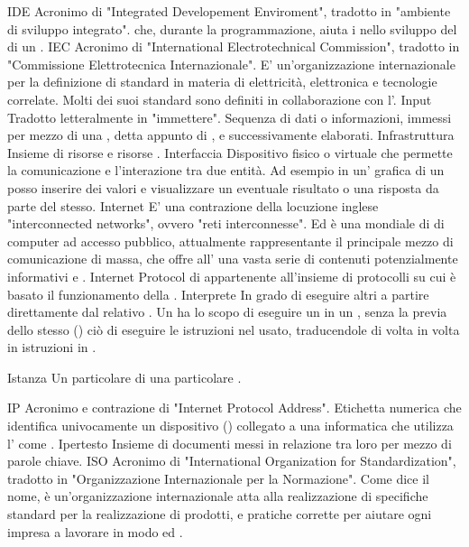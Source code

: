 \elemento
{IDE} 
{Acronimo di "Integrated Developement Enviroment", tradotto in "ambiente di sviluppo integrato".  che, durante la programmazione, aiuta i  nello sviluppo del  di un .}
\elemento
{IEC} 
{Acronimo di "International Electrotechnical Commission", tradotto in "Commissione Elettrotecnica Internazionale". E' un'organizzazione internazionale per la definizione di standard in materia di elettricità, elettronica e tecnologie correlate. Molti dei suoi standard sono definiti in collaborazione con l'.}
\elemento
{Input}
{Tradotto letteralmente in "immettere". Sequenza di dati o informazioni, immessi per mezzo di una , detta appunto di , e successivamente elaborati.}
\elemento
{Infrastruttura} 
{Insieme di risorse  e risorse .}
\elemento
{Interfaccia} 
{Dispositivo fisico o virtuale che permette la comunicazione e l'interazione tra due entità. Ad esempio in un' grafica di un  posso inserire dei valori  e visualizzare un eventuale risultato o una risposta da parte del  stesso.}
\elemento
{Internet} 
{E' una contrazione della locuzione inglese "interconnected networks", ovvero "reti interconnesse".
 Ed è una  mondiale di  di computer ad accesso pubblico, attualmente rappresentante il principale mezzo di comunicazione di massa, che offre all' una vasta serie di contenuti potenzialmente informativi e .}
\elemento
{Internet Protocol}
{ di  appartenente all'insieme di protocolli   su cui è basato il funzionamento della  .}
\elemento
{Interprete} 
{ In grado di eseguire altri  a partire direttamente dal relativo . Un  ha lo scopo di eseguire un  in un , senza la previa  dello stesso () ciò di eseguire le istruzioni nel  usato, traducendole di volta in volta in istruzioni in .}

\elemento
{Istanza}
{Un particolare  di una particolare .}

\elemento
{IP} 
{Acronimo e contrazione di "Internet Protocol Address". Etichetta numerica che identifica univocamente un dispositivo () collegato a una  informatica che utilizza l' come .}
\elemento
{Ipertesto} 
{Insieme di documenti messi in relazione tra loro per mezzo di parole chiave.} 
\elemento
{ISO} 
{Acronimo di "International Organization for Standardization", tradotto in "Organizzazione Internazionale per la Normazione". Come dice il nome, è un'organizzazione internazionale atta alla realizzazione di specifiche standard per la realizzazione di prodotti,  e pratiche corrette per aiutare ogni impresa a lavorare in modo  ed .}

